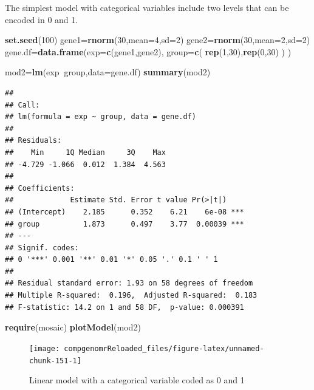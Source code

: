 \documentclass[12pt,]{krantz}
\newenvironment{Shaded}{\begin{snugshade}}{\end{snugshade}}
\newcommand{\DataTypeTok}[1]{\textcolor[rgb]{0.13,0.29,0.53}{#1}}
\newcommand{\DecValTok}[1]{\textcolor[rgb]{0.00,0.00,0.81}{#1}}
\newcommand{\KeywordTok}[1]{\textcolor[rgb]{0.13,0.29,0.53}{\textbf{#1}}}
\newcommand{\NormalTok}[1]{#1}
\newcommand{\OperatorTok}[1]{\textcolor[rgb]{0.81,0.36,0.00}{\textbf{#1}}}
\theoremstyle{definition}
\theoremstyle{definition}
\theoremstyle{definition}
\theoremstyle{remark}
\begin{document}
The simplest model with categorical variables include two levels that
can be encoded in 0 and 1.

\begin{Shaded}
\begin{Highlighting}[]
\KeywordTok{set.seed}\NormalTok{(}\DecValTok{100}\NormalTok{)}
\NormalTok{gene1=}\KeywordTok{rnorm}\NormalTok{(}\DecValTok{30}\NormalTok{,}\DataTypeTok{mean=}\DecValTok{4}\NormalTok{,}\DataTypeTok{sd=}\DecValTok{2}\NormalTok{)}
\NormalTok{gene2=}\KeywordTok{rnorm}\NormalTok{(}\DecValTok{30}\NormalTok{,}\DataTypeTok{mean=}\DecValTok{2}\NormalTok{,}\DataTypeTok{sd=}\DecValTok{2}\NormalTok{)}
\NormalTok{gene.df=}\KeywordTok{data.frame}\NormalTok{(}\DataTypeTok{exp=}\KeywordTok{c}\NormalTok{(gene1,gene2),}
                  \DataTypeTok{group=}\KeywordTok{c}\NormalTok{( }\KeywordTok{rep}\NormalTok{(}\DecValTok{1}\NormalTok{,}\DecValTok{30}\NormalTok{),}\KeywordTok{rep}\NormalTok{(}\DecValTok{0}\NormalTok{,}\DecValTok{30}\NormalTok{) ) )}

\NormalTok{mod2=}\KeywordTok{lm}\NormalTok{(exp}\OperatorTok{~}\NormalTok{group,}\DataTypeTok{data=}\NormalTok{gene.df)}
\KeywordTok{summary}\NormalTok{(mod2)}
\end{Highlighting}
\end{Shaded}

\begin{verbatim}
## 
## Call:
## lm(formula = exp ~ group, data = gene.df)
## 
## Residuals:
##    Min     1Q Median     3Q    Max 
## -4.729 -1.066  0.012  1.384  4.563 
## 
## Coefficients:
##             Estimate Std. Error t value Pr(>|t|)    
## (Intercept)    2.185      0.352    6.21    6e-08 ***
## group          1.873      0.497    3.77  0.00039 ***
## ---
## Signif. codes:  
## 0 '***' 0.001 '**' 0.01 '*' 0.05 '.' 0.1 ' ' 1
## 
## Residual standard error: 1.93 on 58 degrees of freedom
## Multiple R-squared:  0.196,  Adjusted R-squared:  0.183 
## F-statistic: 14.2 on 1 and 58 DF,  p-value: 0.000391
\end{verbatim}

\begin{Shaded}
\begin{Highlighting}[]
\KeywordTok{require}\NormalTok{(mosaic)}
\KeywordTok{plotModel}\NormalTok{(mod2)}
\end{Highlighting}
\end{Shaded}

\begin{figure}

{\centering \texttt{[image: compgenomrReloaded\_files/figure-latex/unnamed-chunk-151-1]} 

}

\caption{Linear model with a categorical variable coded as 0 and 1}\label{fig:unnamed-chunk-151}
\end{figure}
\end{document}
